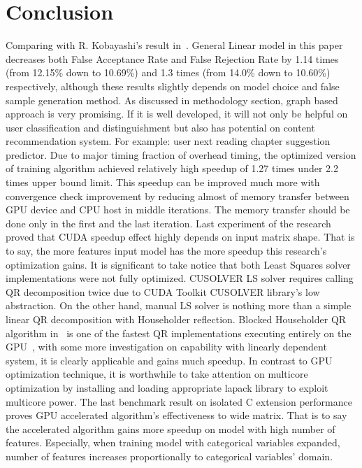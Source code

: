 \documentclass[English]{dicomopapers}
\begin{document}
\section{Conclusion}
Comparing with R. Kobayashi's result in~\cite{kobayashi1}. General Linear model in this paper decreases both False Acceptance Rate and False Rejection Rate by 1.14 times (from 12.15\% down to 10.69\%) and 1.3 times (from 14.0\% down to 10.60\%) respectively, although these results slightly depends on model choice and false sample generation method. As discussed in methodology section, graph based approach is very promising. If it is well developed, it will not only be helpful on user classification and distinguishment but also has potential on content recommendation system. For example: user next reading chapter suggestion predictor.\newline
Due to major timing fraction of overhead timing, the optimized version of training algorithm achieved relatively high speedup of 1.27 times under 2.2 times upper bound limit. This speedup can be improved much more with convergence check improvement by reducing almost of memory transfer between GPU device and CPU host in middle iterations. The memory transfer should be done only in the first and the last iteration. Last experiment of the research proved that CUDA speedup effect highly depends on input matrix shape. That is to say, the more features input model has the more speedup this research's optimization gains. It is significant to take notice that both Least Squares solver implementations were not fully optimized. CUSOLVER LS solver requires calling QR decomposition twice due to CUDA Toolkit CUSOLVER library's low abstraction. On the other hand, manual LS solver is nothing more than a simple linear QR decomposition with Householder reflection. Blocked Householder QR algorithm in~\cite{Kerr:2009:QDG:1513895.1513904} is one of the fastest QR implementations executing entirely on the GPU~\cite{Kerr:2009:QDG:1513895.1513904}, with some more investigation on capability with linearly dependent system, it is clearly applicable and gains much speedup. In contrast to GPU optimization technique, it is worthwhile to take attention on multicore optimization by installing and loading appropriate lapack library to exploit multicore power.\newline
The last benchmark result on isolated C extension performance proves GPU accelerated algorithm's effectiveness to wide matrix. That is to say the accelerated algorithm gains more speedup on model with high number of features. Especially, when training model with categorical variables expanded, number of features increases proportionally to categorical variables' domain.



\end{document}
